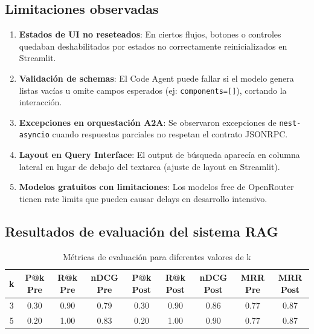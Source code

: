 \documentclass[12pt,a4paper]{article}
\begin{document}
\subsection{Limitaciones observadas}

\begin{enumerate}
    \item \textbf{Estados de UI no reseteados}: En ciertos flujos, botones o controles quedaban deshabilitados por estados no correctamente reinicializados en Streamlit.
    
    \item \textbf{Validación de schemas}: El Code Agent puede fallar si el modelo genera listas vacías u omite campos esperados (ej: \texttt{components=[]}), cortando la interacción.
    
    \item \textbf{Excepciones en orquestación A2A}: Se observaron excepciones de \texttt{nest-asyncio} cuando respuestas parciales no respetan el contrato JSONRPC.
    
    \item \textbf{Layout en Query Interface}: El output de búsqueda aparecía en columna lateral en lugar de debajo del textarea (ajuste de layout en Streamlit).
    
    \item \textbf{Modelos gratuitos con limitaciones}: Los modelos free de OpenRouter tienen rate limits que pueden causar delays en desarrollo intensivo.
\end{enumerate}

\subsection{Resultados de evaluación del sistema RAG}

\begin{table}[H]
\centering
\caption{Métricas de evaluación para diferentes valores de k}
\label{tab:metricas}
\begingroup
\footnotesize                 %
\setlength{\tabcolsep}{4pt}   %
\begin{adjustbox}{max width=\linewidth}
\begin{tabular}{@{}ccccccccc@{}}
\toprule
\textbf{k} & \textbf{P@k Pre} & \textbf{R@k Pre} & \textbf{nDCG Pre} & \textbf{P@k Post} & \textbf{R@k Post} & \textbf{nDCG Post} & \textbf{MRR Pre} & \textbf{MRR Post} \\
\midrule
3 & 0.30 & 0.90 & 0.79 & 0.30 & 0.90 & 0.86 & 0.77 & 0.87 \\
5 & 0.20 & 1.00 & 0.83 & 0.20 & 1.00 & 0.90 & 0.77 & 0.87 \\
\bottomrule
\end{tabular}
\end{adjustbox}
\endgroup
\end{table}
\end{document}
